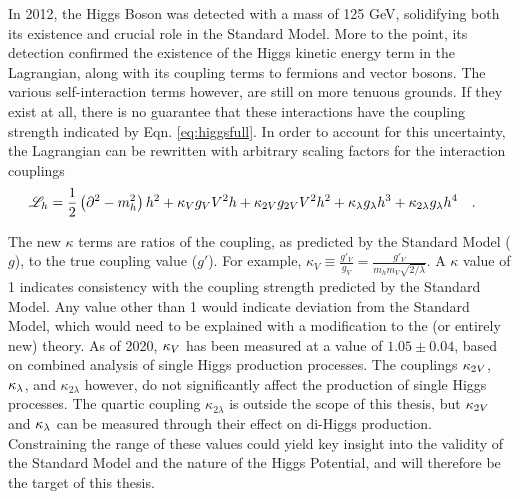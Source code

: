     In 2012, the Higgs Boson was detected with a mass of 125 GeV, solidifying both its existence and crucial role in the Standard Model.
    More to the point, its detection confirmed the existence of the Higgs kinetic energy term in the Lagrangian,
        along with its coupling terms to fermions and vector bosons.
    The various self-interaction terms however, are still on more tenuous grounds.
    If they exist at all, there is no guarantee that these interactions have the coupling strength indicated by Eqn. \ref{eq:higgsfull}.
    In order to account for this uncertainty, the Lagrangian can be rewritten with arbitrary scaling factors for the interaction couplings
    \begin{equation} \begin{split} \label{eq:higgskappas}
        \mathscr{L}_h &= \frac{1}{2} \left(\partial^2 - m_h^2 \right) h^2
            + \kappa_{V} g_V V^2 h + \kappa_{2V} g_{2V} V^2 h^2
            + \kappa_{\lambda} g_{\lambda} h^3 + \kappa_{2 \lambda} g_{\lambda} h^4
        \quad.
    \end{split} \end{equation}

    The new $\kappa$ terms are ratios of the coupling, as predicted by the Standard Model ($g$), to the true coupling value ($g'$).
    For example, $\kappa_V \equiv \frac{g'_V}{g_V} = \frac{g'_V}{m_h m_V \sqrt{2/\lambda}}$.
    A $\kappa$ value of 1 indicates consistency with the coupling strength predicted by the Standard Model.
    Any value other than 1 would indicate deviation from the Standard Model,
        which would need to be explained with a modification to the (or entirely new) theory.
    As of 2020, $\kappa_{V}$ has been measured at a value of $1.05 \pm 0.04$,
        based on combined analysis of single Higgs production processes\cite{paper:higgs_combined}.
    The couplings $\kappa_{2V}$, $\kappa_{\lambda}$, and $\kappa_{2\lambda}$ however, do not significantly affect the production of single Higgs processes.
    The quartic coupling $\kappa_{2\lambda}$ is outside the scope of this thesis,
        but $\kappa_{2V}$ and $\kappa_{\lambda}$ can be measured through their effect on di-Higgs production.
    Constraining the range of these values could yield key insight into the validity of the Standard Model and the nature of the Higgs Potential,
        and will therefore be the target of this thesis.
